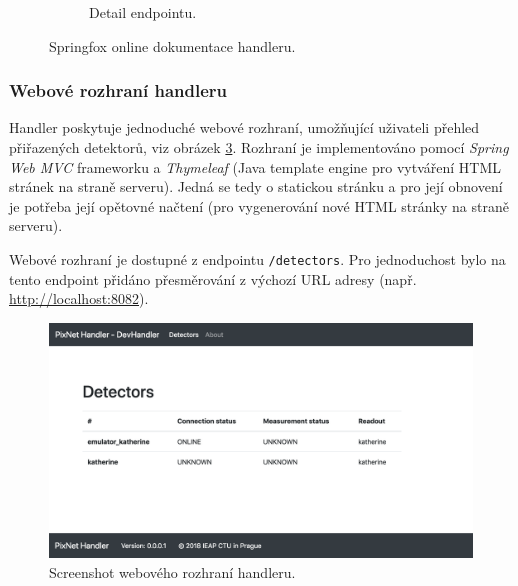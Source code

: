 \begin{figure}[h]
\begin{center}
\begin{subfigure}{7.0cm}
			\caption{Detail endpointu.}
			\label{fig:handler:swagger_a}
		\end{subfigure}
		\caption{Springfox online dokumentace handleru.}
		\label{fig:handler:swagger}
	\end{center}
\end{figure}

\subsubsection{Webové rozhraní handleru}\label{chap:handler:spring:web}
Handler poskytuje jednoduché webové rozhraní, umožňující uživateli přehled přiřazených detektorů, viz obrázek \ref{fig:handler:web}. Rozhraní je implementováno pomocí \textit{Spring Web MVC} frameworku a \textit{Thymeleaf} (Java template engine pro vytváření HTML stránek na straně serveru). Jedná se tedy o statickou stránku a pro její obnovení je potřeba její opětovné načtení (pro vygenerování nové HTML stránky na straně serveru).

Webové rozhraní je dostupné z endpointu \texttt{/detectors}. Pro jednoduchost bylo na tento endpoint přidáno přesměrování z výchozí URL adresy (např. \url{http://localhost:8082}).

\begin{figure}[h]
	\begin{center}
		\vspace*{1cm}
		\includegraphics[width=14cm]{figures/handler_web.png}
		\caption{Screenshot webového rozhraní handleru.}
		\label{fig:handler:web}
	\end{center}
\end{figure}

